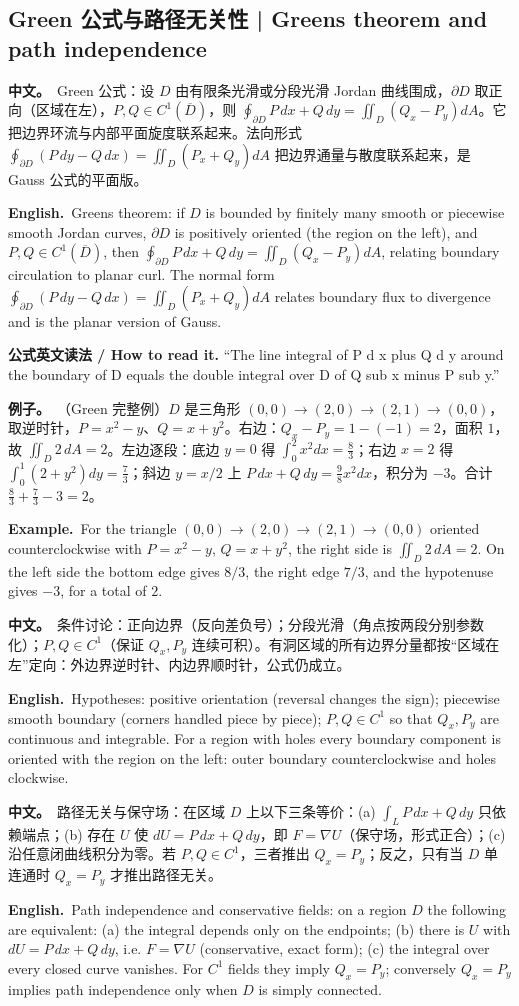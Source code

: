 \documentclass[UTF8,11pt,a4paper]{ctexart}
\newcommand{\BOTH}[2]{\par\noindent\textbf{中文。}\ #1\par\noindent\textbf{English.}\ #2\par}
\newcommand{\EX}[2]{\par\noindent\textbf{例子。}\ #1\par\noindent\textbf{Example.}\ #2\par}
\newcommand{\READ}[1]{\par\noindent\textbf{公式英文读法 / How to read it.} #1\par}
\begin{document}
\subsection{Green 公式与路径无关性 | Green\textquotesingle s theorem and path independence}
\BOTH{Green 公式：设 $D$ 由有限条光滑或分段光滑 Jordan 曲线围成，$\partial D$ 取正向（区域在左），$P,Q\in C^1(\overline D)$，则 $\oint_{\partial D}P\,dx+Q\,dy=\iint_D(Q_x-P_y)dA$。它把边界环流与内部平面旋度联系起来。法向形式 $\oint_{\partial D}(P\,dy-Q\,dx)=\iint_D(P_x+Q_y)dA$ 把边界通量与散度联系起来，是 Gauss 公式的平面版。}{Green\textquotesingle s theorem: if $D$ is bounded by finitely many smooth or piecewise smooth Jordan curves, $\partial D$ is positively oriented (the region on the left), and $P,Q\in C^1(\overline D)$, then $\oint_{\partial D}P\,dx+Q\,dy=\iint_D(Q_x-P_y)dA$, relating boundary circulation to planar curl. The normal form $\oint_{\partial D}(P\,dy-Q\,dx)=\iint_D(P_x+Q_y)dA$ relates boundary flux to divergence and is the planar version of Gauss.}
\READ{“The line integral of P d x plus Q d y around the boundary of D equals the double integral over D of Q sub x minus P sub y.”}
\EX{（Green 完整例）$D$ 是三角形 $(0,0)\to(2,0)\to(2,1)\to(0,0)$，取逆时针，$P=x^2-y$、$Q=x+y^2$。右边：$Q_x-P_y=1-(-1)=2$，面积 $1$，故 $\iint_D2\,dA=2$。左边逐段：底边 $y=0$ 得 $\int_0^2x^2dx=\frac83$；右边 $x=2$ 得 $\int_0^1(2+y^2)dy=\frac73$；斜边 $y=x/2$ 上 $P\,dx+Q\,dy=\frac98x^2dx$，积分为 $-3$。合计 $\frac83+\frac73-3=2$。}{For the triangle $(0,0)\to(2,0)\to(2,1)\to(0,0)$ oriented counterclockwise with $P=x^2-y$, $Q=x+y^2$, the right side is $\iint_D2\,dA=2$. On the left side the bottom edge gives $8/3$, the right edge $7/3$, and the hypotenuse gives $-3$, for a total of $2$.}
\BOTH{条件讨论：正向边界（反向差负号）；分段光滑（角点按两段分别参数化）；$P,Q\in C^1$（保证 $Q_x,P_y$ 连续可积）。有洞区域的所有边界分量都按“区域在左”定向：外边界逆时针、内边界顺时针，公式仍成立。}{Hypotheses: positive orientation (reversal changes the sign); piecewise smooth boundary (corners handled piece by piece); $P,Q\in C^1$ so that $Q_x,P_y$ are continuous and integrable. For a region with holes every boundary component is oriented with the region on the left: outer boundary counterclockwise and holes clockwise.}
\BOTH{路径无关与保守场：在区域 $D$ 上以下三条等价：(a) $\int_LP\,dx+Q\,dy$ 只依赖端点；(b) 存在 $U$ 使 $dU=P\,dx+Q\,dy$，即 $F=\nabla U$（保守场，形式正合）；(c) 沿任意闭曲线积分为零。若 $P,Q\in C^1$，三者推出 $Q_x=P_y$；反之，只有当 $D$ 单连通时 $Q_x=P_y$ 才推出路径无关。}{Path independence and conservative fields: on a region $D$ the following are equivalent: (a) the integral depends only on the endpoints; (b) there is $U$ with $dU=P\,dx+Q\,dy$, i.e. $F=\nabla U$ (conservative, exact form); (c) the integral over every closed curve vanishes. For $C^1$ fields they imply $Q_x=P_y$; conversely $Q_x=P_y$ implies path independence only when $D$ is simply connected.}
\end{document}
